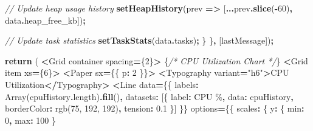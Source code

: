 \documentclass[
]{article}
\newenvironment{Shaded}{\begin{snugshade}}{\end{snugshade}}
\newcommand{\AttributeTok}[1]{\textcolor[rgb]{0.13,0.29,0.53}{#1}}
\newcommand{\BuiltInTok}[1]{#1}
\newcommand{\CommentTok}[1]{\textcolor[rgb]{0.56,0.35,0.01}{\textit{#1}}}
\newcommand{\ControlFlowTok}[1]{\textcolor[rgb]{0.13,0.29,0.53}{\textbf{#1}}}
\newcommand{\DecValTok}[1]{\textcolor[rgb]{0.00,0.00,0.81}{#1}}
\newcommand{\FloatTok}[1]{\textcolor[rgb]{0.00,0.00,0.81}{#1}}
\newcommand{\FunctionTok}[1]{\textcolor[rgb]{0.13,0.29,0.53}{\textbf{#1}}}
\newcommand{\KeywordTok}[1]{\textcolor[rgb]{0.13,0.29,0.53}{\textbf{#1}}}
\newcommand{\NormalTok}[1]{#1}
\newcommand{\OperatorTok}[1]{\textcolor[rgb]{0.81,0.36,0.00}{\textbf{#1}}}
\newcommand{\StringTok}[1]{\textcolor[rgb]{0.31,0.60,0.02}{#1}}
\begin{document}
\begin{Shaded}
\begin{Highlighting}[]
      \CommentTok{// Update heap usage history}
      \FunctionTok{setHeapHistory}\NormalTok{(prev }\KeywordTok{=\textgreater{}}\NormalTok{ [}\OperatorTok{...}\NormalTok{prev}\OperatorTok{.}\FunctionTok{slice}\NormalTok{(}\OperatorTok{{-}}\DecValTok{60}\NormalTok{)}\OperatorTok{,}\NormalTok{ data}\OperatorTok{.}\AttributeTok{heap\_free\_kb}\NormalTok{])}\OperatorTok{;}

      \CommentTok{// Update task statistics}
      \FunctionTok{setTaskStats}\NormalTok{(data}\OperatorTok{.}\AttributeTok{tasks}\NormalTok{)}\OperatorTok{;}
\NormalTok{    \}}
\NormalTok{  \}}\OperatorTok{,}\NormalTok{ [lastMessage])}\OperatorTok{;}

  \ControlFlowTok{return}\NormalTok{ (}
    \OperatorTok{\textless{}}\NormalTok{Grid container spacing}\OperatorTok{=}\NormalTok{\{}\DecValTok{2}\NormalTok{\}}\OperatorTok{\textgreater{}}
\NormalTok{      \{}\CommentTok{/* CPU Utilization Chart */}\NormalTok{\}}
      \OperatorTok{\textless{}}\NormalTok{Grid item xs}\OperatorTok{=}\NormalTok{\{}\DecValTok{6}\NormalTok{\}}\OperatorTok{\textgreater{}}
        \OperatorTok{\textless{}}\NormalTok{Paper sx}\OperatorTok{=}\NormalTok{\{\{ p}\OperatorTok{:} \DecValTok{2}\NormalTok{ \}\}}\OperatorTok{\textgreater{}}
          \OperatorTok{\textless{}}\NormalTok{Typography variant}\OperatorTok{=}\StringTok{"h6"}\OperatorTok{\textgreater{}}\NormalTok{CPU Utilization}\OperatorTok{\textless{}/}\NormalTok{Typography}\OperatorTok{\textgreater{}}
          \OperatorTok{\textless{}}\NormalTok{Line}
\NormalTok{            data}\OperatorTok{=}\NormalTok{\{\{}
\NormalTok{              labels}\OperatorTok{:} \BuiltInTok{Array}\NormalTok{(cpuHistory}\OperatorTok{.}\AttributeTok{length}\NormalTok{)}\OperatorTok{.}\FunctionTok{fill}\NormalTok{(}\StringTok{\textquotesingle{}\textquotesingle{}}\NormalTok{)}\OperatorTok{,}
\NormalTok{              datasets}\OperatorTok{:}\NormalTok{ [\{}
\NormalTok{                label}\OperatorTok{:} \StringTok{\textquotesingle{}CPU \%\textquotesingle{}}\OperatorTok{,}
\NormalTok{                data}\OperatorTok{:}\NormalTok{ cpuHistory}\OperatorTok{,}
\NormalTok{                borderColor}\OperatorTok{:} \StringTok{\textquotesingle{}rgb(75, 192, 192)\textquotesingle{}}\OperatorTok{,}
\NormalTok{                tension}\OperatorTok{:} \FloatTok{0.1}
\NormalTok{              \}]}
\NormalTok{            \}\}}
\NormalTok{            options}\OperatorTok{=}\NormalTok{\{\{}
\NormalTok{              scales}\OperatorTok{:}\NormalTok{ \{}
\NormalTok{                y}\OperatorTok{:}\NormalTok{ \{ min}\OperatorTok{:} \DecValTok{0}\OperatorTok{,}\NormalTok{ max}\OperatorTok{:} \DecValTok{100}\NormalTok{ \}}

\end{Highlighting}
\end{Shaded}
\end{document}
